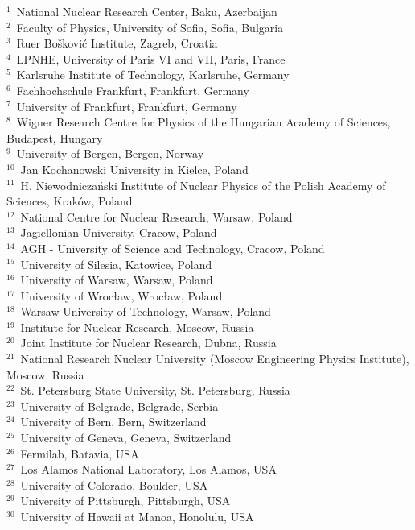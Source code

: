 
\noindent
$^{1}$~National Nuclear Research Center, Baku, Azerbaijan\\
$^{2}$~Faculty of Physics, University of Sofia, Sofia, Bulgaria\\
$^{3}$~Ru{\dj}er Bo\v{s}kovi\'c Institute, Zagreb, Croatia\\
$^{4}$~LPNHE, University of Paris VI and VII, Paris, France\\
$^{5}$~Karlsruhe Institute of Technology, Karlsruhe, Germany\\
$^{6}$~Fachhochschule Frankfurt, Frankfurt, Germany\\
$^{7}$~University of Frankfurt, Frankfurt, Germany\\
$^{8}$~Wigner Research Centre for Physics of the Hungarian Academy of Sciences, Budapest, Hungary\\
$^{9}$~University of Bergen, Bergen, Norway\\
$^{10}$~Jan Kochanowski University in Kielce, Poland\\
$^{11}$~H. Niewodnicza\'nski Institute of Nuclear Physics of the
      Polish Academy of Sciences, Krak\'ow, Poland\\
$^{12}$~National Centre for Nuclear Research, Warsaw, Poland\\
$^{13}$~Jagiellonian University, Cracow, Poland\\
$^{14}$~AGH - University of Science and Technology, Cracow, Poland\\
$^{15}$~University of Silesia, Katowice, Poland\\
$^{16}$~University of Warsaw, Warsaw, Poland\\
$^{17}$~University of Wroc{\l}aw,  Wroc{\l}aw, Poland\\
$^{18}$~Warsaw University of Technology, Warsaw, Poland\\
$^{19}$~Institute for Nuclear Research, Moscow, Russia\\
$^{20}$~Joint Institute for Nuclear Research, Dubna, Russia\\
$^{21}$~National Research Nuclear University (Moscow Engineering Physics Institute), Moscow, Russia\\
$^{22}$~St. Petersburg State University, St. Petersburg, Russia\\
$^{23}$~University of Belgrade, Belgrade, Serbia\\
$^{24}$~University of Bern, Bern, Switzerland\\
$^{25}$~University of Geneva, Geneva, Switzerland\\
$^{26}$~Fermilab, Batavia, USA\\
$^{27}$~Los Alamos National Laboratory, Los Alamos, USA\\
$^{28}$~University of Colorado, Boulder, USA\\
$^{29}$~University of Pittsburgh, Pittsburgh, USA\\
$^{30}$~University of Hawaii at Manoa, Honolulu, USA\\
